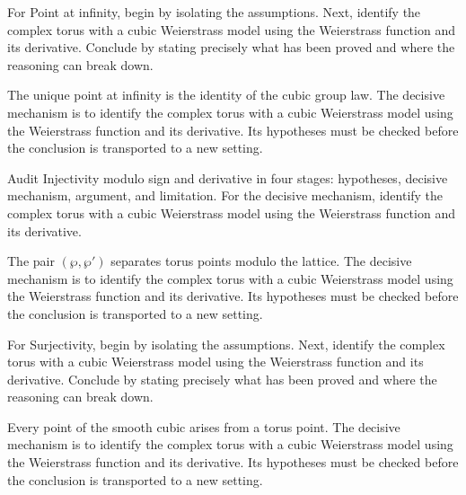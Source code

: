 \begin{problem}\label{prob:iv31-problem-03}
For Point at infinity, begin by isolating the assumptions. Next, identify the complex torus with a cubic Weierstrass model using the Weierstrass function and its derivative. Conclude by stating precisely what has been proved and where the reasoning can break down.
\end{problem}
\begin{solution}
The unique point at infinity is the identity of the cubic group law. The decisive mechanism is to identify the complex torus with a cubic Weierstrass model using the Weierstrass function and its derivative. Its hypotheses must be checked before the conclusion is transported to a new setting.
\end{solution}

\begin{problem}\label{prob:iv31-problem-04}
Audit Injectivity modulo sign and derivative in four stages: hypotheses, decisive mechanism, argument, and limitation. For the decisive mechanism, identify the complex torus with a cubic Weierstrass model using the Weierstrass function and its derivative.
\end{problem}
\begin{solution}
The pair $(\wp,\wp')$ separates torus points modulo the lattice. The decisive mechanism is to identify the complex torus with a cubic Weierstrass model using the Weierstrass function and its derivative. Its hypotheses must be checked before the conclusion is transported to a new setting.
\end{solution}

\begin{problem}\label{prob:iv31-problem-05}
For Surjectivity, begin by isolating the assumptions. Next, identify the complex torus with a cubic Weierstrass model using the Weierstrass function and its derivative. Conclude by stating precisely what has been proved and where the reasoning can break down.
\end{problem}
\begin{solution}
Every point of the smooth cubic arises from a torus point. The decisive mechanism is to identify the complex torus with a cubic Weierstrass model using the Weierstrass function and its derivative. Its hypotheses must be checked before the conclusion is transported to a new setting.
\end{solution}

